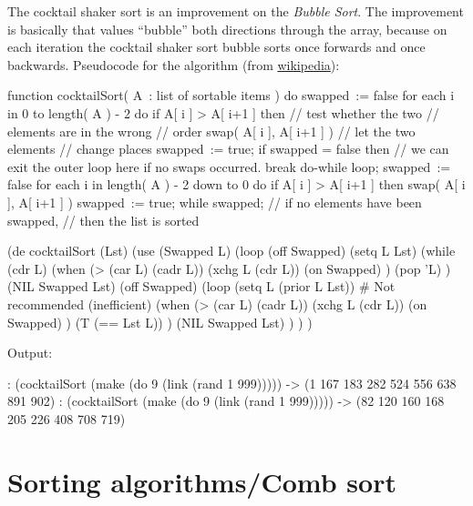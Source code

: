 The cocktail shaker sort is an improvement on the \emph{Bubble Sort}.
The improvement is basically that values ``bubble'' both directions
through the array, because on each iteration the cocktail shaker sort
bubble sorts once forwards and once backwards. Pseudocode for the
algorithm (from
\href{http://en.wikipedia.org/wiki/Cocktail\_sort}{wikipedia}):

\begin{wideverbatim}
function cocktailSort( A : list of sortable items )
 do
   swapped := false
   for each i in 0 to length( A ) - 2 do
     if A[ i ] > A[ i+1 ] then // test whether the two 
                               // elements are in the wrong 
                               // order
       swap( A[ i ], A[ i+1 ] ) // let the two elements
                                // change places
       swapped := true;
   if swapped = false then
     // we can exit the outer loop here if no swaps occurred.
     break do-while loop;
   swapped := false
   for each i in length( A ) - 2 down to 0 do
     if A[ i ] > A[ i+1 ] then
       swap( A[ i ], A[ i+1 ] )
       swapped := true;
 while swapped; // if no elements have been swapped, 
                // then the list is sorted
\end{wideverbatim}



\begin{wideverbatim}

(de cocktailSort (Lst)
   (use (Swapped L)
      (loop
         (off Swapped)
         (setq L Lst)
         (while (cdr L)
            (when (> (car L) (cadr L))
               (xchg L (cdr L))
               (on Swapped) )
            (pop 'L) )
         (NIL Swapped Lst)
         (off Swapped)
         (loop
            (setq L (prior L Lst))  # Not recommended (inefficient)
            (when (> (car L) (cadr L))
               (xchg L (cdr L))
               (on Swapped) )
            (T (== Lst L)) )
         (NIL Swapped Lst) ) ) )

Output:

: (cocktailSort (make (do 9 (link (rand 1 999)))))
-> (1 167 183 282 524 556 638 891 902)
: (cocktailSort (make (do 9 (link (rand 1 999)))))
-> (82 120 160 168 205 226 408 708 719)

\end{wideverbatim}

\pagebreak{}
\section*{Sorting algorithms/Comb sort}

